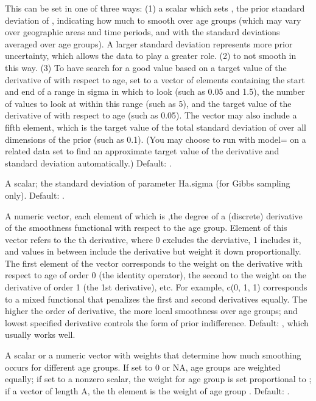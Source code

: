 \begin{Arguments}
\begin{ldescription}
\item[\code{Ha.sigma}] This can be set in one of three ways: (1) a scalar
which sets , the prior standard deviation of ,
indicating how much to smooth  over age groups (which may
vary over geographic areas and time periods, and with the standard
deviations averaged over age groups). A larger standard deviation
represents more prior uncertainty, which allows the data to play a
greater role. (2)  to not smooth in this way. (3) To have 
search for a good value based on a target value of the derivative of
 with respect to age, set to a vector of elements containing
the start and end of a range in sigma in which to look (such as 0.05
and 1.5), the number of values to look at within this range (such as
5), and the target value of the derivative of  with respect
to age (such as 0.05). The vector may also include a fifth element,
which is the target value of the total standard deviation of 
over all dimensions of the prior (such as 0.1). (You may choose to
run  with model= on a related data set to find an
approximate target value of the derivative and standard deviation
automatically.) Default: .

\item[\code{Ha.sigma.sd}] A scalar; the standard deviation of parameter
Ha.sigma (for Gibbs sampling only). Default: .

\item[\code{Ha.deriv}] A numeric vector, each element of which is ,the
degree of a (discrete) derivative of the
smoothness functional with respect to the age group. Element  of
this vector refers to the th derivative, where 0 excludes
the derviative, 1 includes it, and values in between include the
derivative but weight it down proportionally. The first element of
the vector corresponds to the weight on the derivative with respect
to age of order 0 (the identity operator), the second to the weight
on the derivative of order 1 (the 1st derivative), etc. For example,
c(0, 1, 1) corresponds to a mixed functional that penalizes the
first and second derivatives equally. The higher the order of
derivative, the more local smoothness over age groups; and lowest
specified derivative controls the form of prior
indifference. Default: , which usually works well.

\item[\code{Ha.age.weight}] A scalar or a numeric vector with weights that
determine how much smoothing occurs for different age groups. If set
to 0 or NA, age groups are weighted equally; if set to a nonzero
scalar, the weight for age group  is set proportional to
;
if a vector of length A, the th element is the
weight of age group . Default: .


\end{ldescription}
\end{Arguments}
